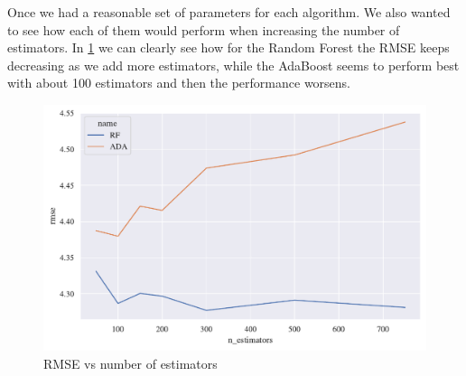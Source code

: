 Once we had a reasonable set of parameters for each algorithm. We also wanted to see how each of them would perform when increasing the number of estimators. In \cref{fig:ense} we can clearly see how for the Random Forest the RMSE keeps decreasing as we add more estimators, while the AdaBoost seems to perform best with about 100 estimators and then the performance worsens. 

\begin{figure}[H]
    \centering
    \includegraphics[width=0.8\linewidth]{figures/ensemble.pdf}
    \caption{RMSE vs number of estimators}
    \label{fig:ense}
\end{figure}
